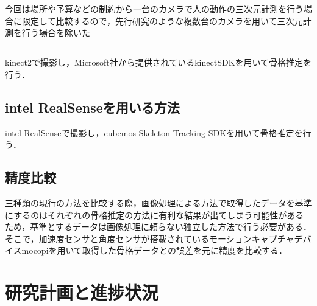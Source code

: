 \documentclass[titlepage]{jarticle}
\begin{document}
今回は場所や予算などの制約から一台のカメラで人の動作の三次元計測を行う場合に限定して比較するので，先行研究\cite{turugi}のような複数台のカメラを用いて三次元計測を行う場合を除いた

%
%
\subsection{}
%
kinect2で撮影し，Microsoft社から提供されているkinectSDKを用いて骨格推定を行う．
%
%
\subsection{intel RealSenseを用いる方法}
%
intel RealSenseで撮影し，cubemos Skeleton Tracking SDKを用いて骨格推定を行う．
%
%
\subsection{精度比較}
%
三種類の現行の方法を比較する際，画像処理による方法で取得したデータを基準にするのはそれぞれの骨格推定の方法に有利な結果が出てしまう可能性があるため，基準とするデータは画像処理に頼らない独立した方法で行う必要がある．
そこで，加速度センサと角度センサが搭載されているモーションキャプチャデバイスmocopiを用いて取得した骨格データとの誤差を元に精度を比較する．
%
%
%

%
%
%
%
%

%
%
%
%
\section{研究計画と進捗状況}
%

%
%
\end{document}
